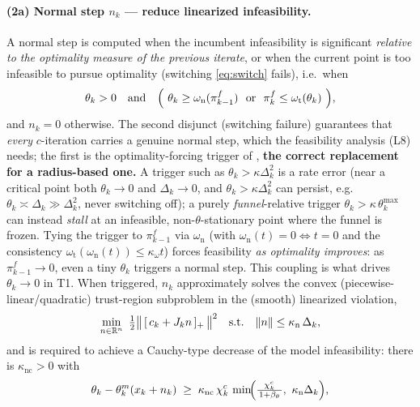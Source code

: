 \paragraph{(2a) Normal step $n_k$ --- reduce linearized infeasibility.}
A normal step is computed when the incumbent infeasibility is significant
\emph{relative to the optimality measure of the previous iterate}, or when the
current point is too infeasible to pursue optimality (switching \eqref{eq:switch}
fails), i.e.\ when
\begin{equation}
  \label{eq:normal-trigger}
  \theta_k>0 \quad\text{and}\quad
  \Bigl(\ \theta_k\ge\omega_{\mathrm n}(\pi_{k-1}^f)
     \ \ \text{or}\ \ \pi_k^f\le\omega_{\mathrm t}(\theta_k)\ \Bigr),
\end{equation}
and $n_k=0$ otherwise. The second disjunct (switching failure) guarantees that
\emph{every} $c$-iteration carries a genuine normal step, which the feasibility
analysis (L8) needs; the first is the optimality-forcing trigger of
\citet[(2.30)]{GouldToint2010}, \textbf{the correct replacement for a radius-based one.}
A trigger such as $\theta_k>\kappa\Delta_k^2$ is a rate error (near a critical point
both $\theta_k\to0$ and $\Delta_k\to0$, and $\theta_k>\kappa\Delta_k^2$ can persist,
e.g.\ $\theta_k\asymp\Delta_k\gg\Delta_k^2$, never switching off); a purely
\emph{funnel}-relative trigger $\theta_k>\kappa\,\theta_k^{\max}$ can instead
\emph{stall} at an infeasible, non-$\theta$-stationary point where the funnel is
frozen. Tying the trigger to $\pi_{k-1}^f$ via $\omega_{\mathrm n}$ (with
$\omega_{\mathrm n}(t)=0\iff t=0$ and the consistency
$\omega_{\mathrm t}(\omega_{\mathrm n}(t))\le\kappa_\omega t$) forces feasibility
\emph{as optimality improves}: as $\pi_{k-1}^f\to0$, even a tiny $\theta_k$
triggers a normal step. This coupling is what drives $\theta_k\to0$ in T1. When
triggered,
$n_k$ approximately solves the convex (piecewise-linear/quadratic) trust-region
subproblem in the (smooth) linearized violation,
\begin{equation}
  \label{eq:normal-sub}
  \min_{n\in\mathbb{R}^{n}}\ \tfrac12\bigl\|\,[\,c_k+J_k n\,]_+\,\bigr\|^2
  \quad\text{s.t.}\quad \|n\|\le\kappa_{\mathrm n}\,\Delta_k,
\end{equation}
and is required to achieve a Cauchy-type decrease of the model infeasibility: there
is $\kappa_{\mathrm{nc}}>0$ with
\begin{equation}
  \label{eq:normal-cauchy}
  \theta_k - \theta_k^m(x_k+n_k)
  \;\ge\;
  \kappa_{\mathrm{nc}}\,\chi_k^c\,
  \min\!\Bigl(\tfrac{\chi_k^c}{\,1+\beta_\theta\,},\ \kappa_{\mathrm n}\Delta_k\Bigr),
\end{equation}
